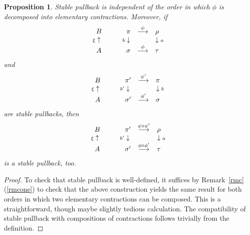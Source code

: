 \documentclass[11pt]{amsart}
\newtheorem{prop}{Proposition}[section]
\theoremstyle{definition}
\theoremstyle{remark}
\newenvironment{pf}{\begin{proof}}{\end{proof}}
\newcommand{\comp}{\mathbin{{\scriptstyle\circ}}}
\newcommand{\ldiag}[1]
       {\makebox[0cm]{\({\scriptstyle#1}\downarrow\phantom{\scriptstyle#1}\)}}
\newcommand{\ldiagup}[1]
       {\makebox[0cm]{\({\scriptstyle#1}\uparrow\phantom{\scriptstyle#1}\)}}
\newcommand{\rdiag}[1]
       {\makebox[0cm]{\(\phantom{\scriptstyle#1}\downarrow{\scriptstyle#1}\)}}
\theoremstyle{plain}
\theoremstyle{definition}
\theoremstyle{remark}
\begin{document}
\begin{prop} \label{cspcn}
Stable pullback is independent of the order in which \(\phi\) is decomposed into
elementary contractions.
Moreover, if
\[
\begin{array}{ccccc}
B & & \pi & \stackrel{\psi}{\longrightarrow} & \rho \\
\ldiagup{\xi} & \phantom{\longrightarrow} & \ldiag{b} &  & \rdiag{a} \\
A & & \sigma & \stackrel{\phi}{\longrightarrow} & \tau
\end{array}
\]
and
\[
\begin{array}{ccccc}
B & & \pi' & \stackrel{\psi'}{\longrightarrow} & \pi \\
\ldiagup{\xi} & \phantom{\longrightarrow} & \ldiag{b'} &  & \rdiag{b} \\
A & & \sigma' & \stackrel{\phi'}{\longrightarrow} & \sigma
\end{array}
\]
are stable pullbacks, then
\[
\begin{array}{ccccc}
B & & \pi' & \stackrel{\psi\comp\psi'}{\longrightarrow} & \rho \\
\ldiagup{\xi} & \phantom{\longrightarrow} & \ldiag{b'} &  & \rdiag{a} \\
A & & \sigma' & \stackrel{\phi\comp\phi'}{\longrightarrow} & \tau
\end{array}
\]
is a stable pullback, too.
\end{prop}
\begin{pf}
To check that stable pullback is well-defined, it suffices by
Remark~\ref{rmc}(\ref{rmcone}) to check that the above
construction yields the same result for both orders in which two elementary
contractions can be composed. This is a
straightforward, though maybe slightly tedious calculation.  The compatibility
of stable pullback with compositions of
contractions follows trivially from the definition.
\end{pf}
\end{document}
